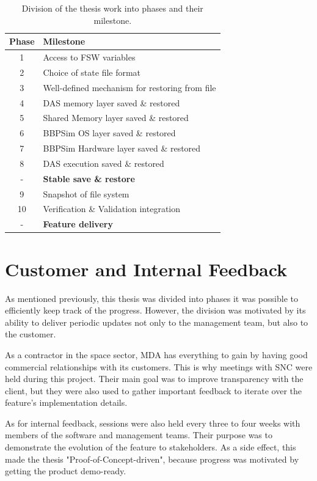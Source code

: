 {\begin{table}[htbp]
	\centering
	\begin{tabularx}{\linewidth}{c X}
	\toprule
	\textbf{Phase} & \textbf{Milestone}\\
	\midrule
	1 & {Access to \gls{FSW} variables}\\
	2 & {Choice of state file format}\\
	3 & {Well-defined mechanism for restoring from file}\\
	4 & {\gls{DAS} memory layer saved \& restored}\\	
	5 & {Shared Memory layer saved \& restored}\\
	6 & {\gls{BBPSim} OS layer saved \& restored}\\
	7 & {\gls{BBPSim} Hardware layer saved \& restored}\\
	8 & {\gls{DAS} execution saved \& restored}\\
	\cmidrule{2-2} 
	-  & \textbf{Stable save \& restore}\\
	\cmidrule{2-2} 
	9 & {Snapshot of file system}\\
	10 & {Verification \& Validation integration}\\
	\cmidrule{2-2} 
	- & \textbf{Feature delivery}\\
	\bottomrule
	\end{tabularx}
	\caption{Division of the thesis work into phases and their milestone.}
	\label{tbl:project-phases}
\end{table}

\section{Customer and Internal Feedback}\label{sec:feedback}
As mentioned previously, this thesis was divided into phases it was possible to efficiently keep track of the progress. However, the division was motivated by its ability to deliver periodic updates not only to the management team, but also to the customer.

As a contractor in the space sector, \gls{MDA} has everything to gain by having good commercial relationships with its customers. This is why meetings with \gls{SNC} were held during this project. Their main goal was to improve transparency with the client, but they were also used to gather important feedback to iterate over the feature's implementation details. 

As for internal feedback, sessions were also held every three to four weeks with members of the software and management teams. Their purpose was to demonstrate the evolution of the feature to stakeholders. As a side effect, this made the thesis "Proof-of-Concept-driven", because progress was motivated by getting the product demo-ready.
}